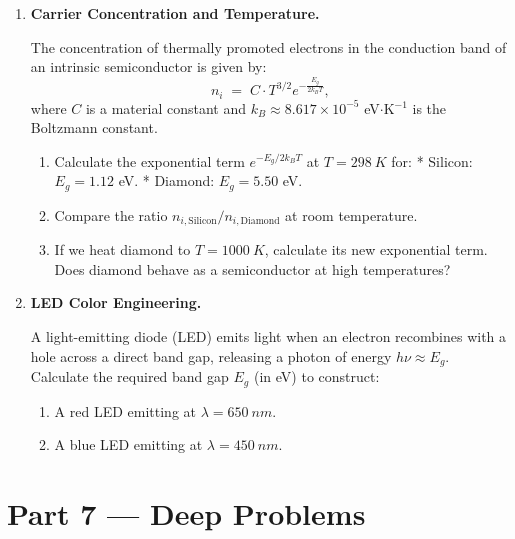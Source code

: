 \documentclass[12pt, a4paper]{book}
\begin{document}
\begin{problembox}
\begin{enumerate}[label=\textbf{P\arabic*.}]
  \item \textbf{Carrier Concentration and Temperature.}
  
        The concentration of thermally promoted electrons in the conduction band of an intrinsic semiconductor is given by:
        \[
          n_i \;=\; C \cdot T^{3/2} e^{-\frac{E_g}{2 k_B T}},
        \]
        where $C$ is a material constant and $k_B \approx 8.617 \times 10^{-5}$ eV$\cdot$K$^{-1}$ is the Boltzmann constant.
        \begin{enumerate}[label=(\alph*)]
          \item Calculate the exponential term $e^{-E_g / 2k_B T}$ at $T = \SI{298}{K}$ for:
                * Silicon: $E_{g} = 1.12$ eV.
                * Diamond: $E_{g} = 5.50$ eV.
          \item Compare the ratio $n_{i,\text{Silicon}}/n_{i,\text{Diamond}}$ at room temperature.
          \item If we heat diamond to $T = \SI{1000}{K}$, calculate its new exponential term. Does diamond behave as a semiconductor at high temperatures?
        \end{enumerate}

  \item \textbf{LED Color Engineering.}
  
        A light-emitting diode (LED) emits light when an electron recombines with a hole across a direct band gap, releasing a photon of energy $h\nu \approx E_g$.
        Calculate the required band gap $E_g$ (in eV) to construct:
        \begin{enumerate}[label=(\alph*)]
          \item A red LED emitting at $\lambda = \SI{650}{nm}$.
          \item A blue LED emitting at $\lambda = \SI{450}{nm}$.
        \end{enumerate}
\end{enumerate}
\end{problembox}

\newpage

\section{Part 7 --- Deep Problems}
\end{document}
